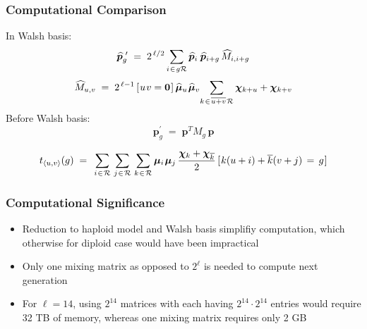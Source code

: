 \documentclass[aspectratio=169]{beamer}
\newcommand{\nudge}{\hspace{0.01in}}
\begin{document}
  \begin{frame}
    \frametitle{Computational Comparison}	  
	 In Walsh basis: 
	    \[
	  \widehat{\bm{p}}_g^{\,\,\prime} \; = \; 2^{\,\ell/2} \sum_{i \nudge \in \nudge g \mathcal{R}}
	  \widehat{\bm{p}}_i \, \nudge \widehat{\bm{p}}_{i+g} \,\widehat{M}_{i,i+g} 	  
	 \]
	  \[
	  \widehat{M}_{u,v} \; = \; 2^{\,\ell-1} \,[\nudge u \nudge v = {\bf
	  0}\nudge]\, \widehat{\bm{\mu}}_u \nudge \widehat{\bm{\mu}}_v \!  \sum_{k
	\nudge \in \nudge \overline{u+v} \nudge \mathcal{R}} \bm{\chi}_{k + u} +
	\bm{\chi}_{k + v}
	\]	
	 Before Walsh basis:
	    \[ \bm{p}_g^\prime \; = \; \bm{p}^T M_g \, \bm{p} \]
	    
	    \[ t_{\langle u,v \rangle}(g) \; = \;\,
      \sum_{i \nudge \in \nudge \mathcal{R}} \, \sum_{j \nudge \in \nudge \mathcal{R}} \,
      \sum_{k \nudge \in \nudge \mathcal{R}}
      \bm{\mu}_i \nudge \bm{\mu}_j \, \frac{\bm{\chi}_k + \bm{\chi}_{\overline{k}}}{2} \,
      [\nudge k (u + i) + \overline{k}(v + j) \, = \, g\nudge]  \]
  \end{frame}
  
  \begin{frame}
    \frametitle{ Computational Significance}
    \begin{itemize}
      \item{\vspace{-0.5in}
      Reduction to haploid model and Walsh basis simplifiy computation, which otherwise for diploid case would have been impractical} 
      \vspace{0.1in}
      \item{Only one mixing matrix as opposed to $2^\ell$ is needed to compute next generation}
      \vspace{0.1in}
      \item{For $\ell = 14$, using $2^{14}$ matrices with each having $2^{14} \cdot 2^{14}$ 
      entries would require 32 TB of memory, whereas one mixing matrix requires only 2 GB}
    \end{itemize}
  \end{frame}
  
\end{document}
